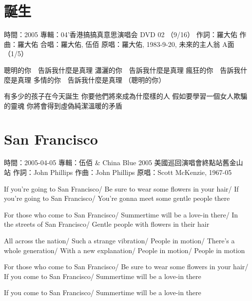 \documentclass[UTF8,a4paper,oneside,twocolumn,12pt]{ctexbook}
\newcommand{\infopair}[2]{\textbullet #1：#2}
\newcommand{\zc}[1][伍佰]{\infopair{作詞}{#1}}
\newcommand{\zq}[1][伍佰]{\infopair{作曲}{#1}}
\newcommand{\zj}[1]{\infopair{專輯}{#1}}
\newcommand{\yc}[1]{\infopair{原唱}{#1}}
\newcommand{\sj}[1]{\infopair{時間}{#1}}
\newenvironment{info}{\begin{flushleft}\kaishu
	}
	{\end{flushleft}\normalsize\yahei\par}
\newenvironment{lyric}{
	}
{}
\begin{document}
\section{誕生}
\begin{info}
	\sj{2005}
	\zj{04'香港搞搞真意思演唱会 DVD 02 （9/16）}
	\zc[羅大佑]
	\zq[羅大佑]
	\infopair{合唱}{羅大佑, 伍佰}
	\yc{羅大佑, 1983-9-20, 未來的主人翁 A面（1/5）}
\end{info}
\begin{lyric}
	聰明的你　告訴我什麼是真理
	瀟灑的你　告訴我什麼是真理
	瘋狂的你　告訴我什麼是真理
	多情的你　告訴我什麼是真理
	（聰明的你）

	有多少的孩子在今天誕生
	你要他們將來成為什麼樣的人
	假如要學習一個女人欺騙的靈魂
	你將會得到虛偽純潔溫暖的矛盾
\end{lyric}

\section{San Francisco}%
\begin{info}
	\sj{2005-04-05}%
	\zj{伍佰 \& China Blue 2005 美國巡回演唱會終點站舊金山站}
	\zc[John Phillips]
	\zq[John Phillips]
	\yc{Scott McKenzie, 1967-05}
\end{info}
\begin{lyric}
	If you're going to San Francisco/
	Be sure to wear some flowers in your hair/
	If you're going to San Francisco/
	You're gonna meet some gentle people there

	For those who come to San Francisco/
	Summertime will be a love-in there/
	In the streets of San Francisco/
	Gentle people with flowers in their hair

	All across the nation/
	Such a strange vibration/
	People in motion/
	There's a whole generation/
	With a new explanation/
	People in motion/
	People in motion

	For those who come to San Francisco/
	Be sure to wear some flowers in your hair/
	If you come to San Francisco/
	Summertime will be a love-in there

	If you come to San Francisco/
	Summertime will be a love-in there
\end{lyric}
\end{document}
